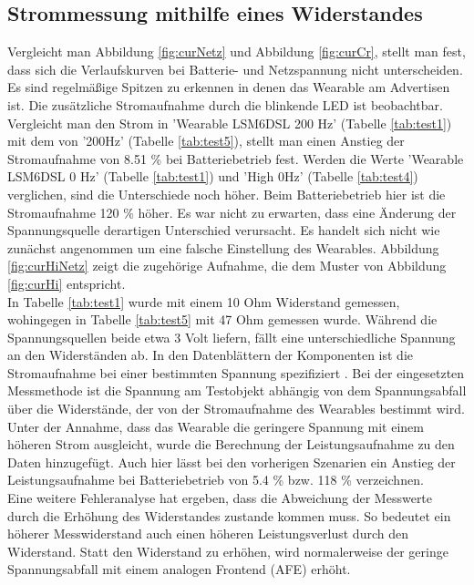 \subsection{Strommessung mithilfe eines Widerstandes}
Vergleicht man Abbildung \ref{fig:curNetz} und Abbildung \ref{fig:curCr}, stellt man fest, dass sich die Verlaufskurven bei Batterie- und Netzspannung nicht unterscheiden.
Es sind regelmäßige Spitzen zu erkennen in denen das Wearable am Advertisen ist.
Die zusätzliche Stromaufnahme durch die blinkende LED ist beobachtbar.\\
Vergleicht man den Strom in 'Wearable LSM6DSL 200 Hz' (Tabelle \ref{tab:test1}) mit dem von '200Hz' (Tabelle \ref{tab:test5}), stellt man einen Anstieg der Stromaufnahme von 8.51 \% bei Batteriebetrieb fest.
Werden die Werte 'Wearable LSM6DSL 0 Hz' (Tabelle \ref{tab:test1}) und 'High 0Hz' (Tabelle \ref{tab:test4}) verglichen, sind die Unterschiede noch höher.
Beim Batteriebetrieb hier ist die Stromaufnahme 120 \% höher.
Es war nicht zu erwarten, dass eine Änderung der Spannungsquelle derartigen Unterschied verursacht.
Es handelt sich nicht wie zunächst angenommen um eine falsche Einstellung des Wearables.
Abbildung \ref{fig:curHiNetz} zeigt die zugehörige Aufnahme, die dem Muster von Abbildung \ref{fig:curHi} entspricht.\\
In Tabelle \ref{tab:test1} wurde mit einem 10 Ohm Widerstand gemessen, wohingegen in Tabelle \ref{tab:test5} mit 47 Ohm gemessen wurde.
Während die Spannungsquellen beide etwa 3 Volt liefern, fällt eine unterschiedliche Spannung an den Widerständen ab.
In den Datenblättern der Komponenten ist die Stromaufnahme bei einer bestimmten Spannung spezifiziert \cite{datasheet_lsm6dsl} \cite{datasheet_nrf52832}.
Bei der eingesetzten Messmethode ist die Spannung am Testobjekt abhängig von dem Spannungsabfall über die Widerstände, der von der Stromaufnahme des Wearables bestimmt wird.\\
Unter der Annahme, dass das Wearable die geringere Spannung mit einem höheren Strom ausgleicht, wurde die Berechnung der Leistungsaufnahme zu den Daten hinzugefügt.
Auch hier lässt bei den vorherigen Szenarien ein Anstieg der Leistungsaufnahme bei Batteriebetrieb von 5.4 \% bzw. 118 \% verzeichnen.\\
Eine weitere Fehleranalyse hat ergeben, dass die Abweichung der Messwerte durch die Erhöhung des Widerstandes zustande kommen muss.
So bedeutet ein höherer Messwiderstand auch einen höheren Leistungsverlust durch den Widerstand.
Statt den Widerstand zu erhöhen, wird normalerweise der geringe Spannungsabfall mit einem analogen Frontend (AFE) erhöht. \cite{site_strommessung}\\
